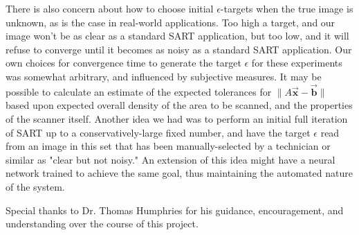 \documentclass[sigconf,twocolumn,nonacm=true]{acmart}
\newcommand{\vvec}[1]{\vec{\boldsymbol{#1}}} %
\newcommand{\norm}[1]{\lVert #1 \rVert} %
\newcommand{\eps}{\epsilon} %
\begin{document}
There is also concern about how to choose initial $\eps$-targets when the true image is unknown, as is the case in real-world applications. Too high a target, and our image won't be as clear as a standard SART application, but too low, and it will refuse to converge until it becomes as noisy as a standard SART application. Our own choices for convergence time to generate the target $\eps$ for these experiments was somewhat arbitrary, and influenced by subjective measures. It may be possible to calculate an estimate of the expected tolerances for $\norm{A\vvec{x}-\vvec{b}}$ based upon expected overall density of the area to be scanned, and the properties of the scanner itself. Another idea we had was to perform an initial full iteration of SART up to a conservatively-large fixed number, and have the target $\eps$ read from an image in this set that has been manually-selected by a technician or similar as "clear but not noisy." An extension of this idea might have a neural network trained to achieve the same goal, thus maintaining the automated nature of the system.

\begin{acks}
Special thanks to Dr. Thomas Humphries for his guidance, encouragement, and understanding over the course of this project.
\end{acks}



\end{document}
